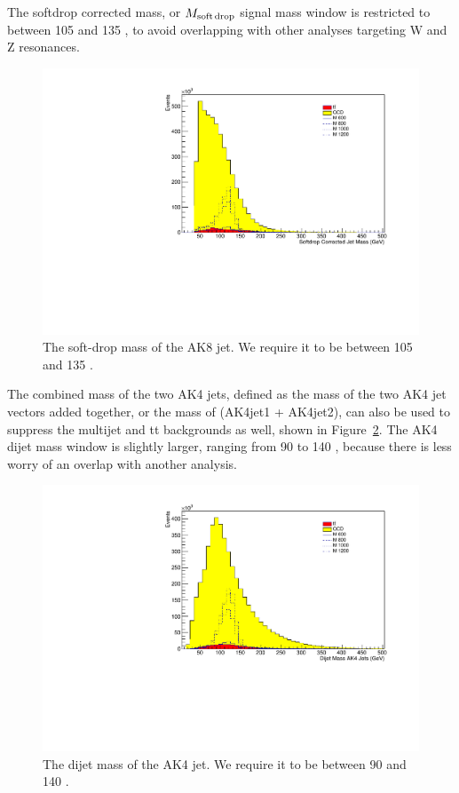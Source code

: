 The softdrop corrected mass, or $M_{\rm soft\,drop}$ signal mass window is restricted to between 105 and 135 \GeV, to avoid overlapping with other analyses targeting W and Z resonances. 

\begin{figure}[thb!]
\begin{center}
\includegraphics[scale=0.5]{F5/shapejetmass.pdf}
\end{center}
\caption{The soft-drop mass of the AK8 jet. We require it to be between 105 and 135 \GeV.}
\label{fig:AK8mass}
\end{figure} 

The combined mass of the two AK4 jets, defined as the mass of the two AK4 jet vectors added together, or the mass of (AK4jet1 + AK4jet2), can also be used to suppress the multijet and tt backgrounds as well, shown in Figure~\ref{fig:AK4dijetmass}. The AK4 dijet mass window is slightly larger, ranging from 90 to 140 \GeV, because there is less worry of an overlap with another analysis.

\begin{figure}[thb!]
\begin{center}
\includegraphics[scale=0.5]{F5/shapedijetmass.pdf}
\end{center}
\caption{The dijet mass of the AK4 jet. We require it to be between 90 and 140 \GeV.}
\label{fig:AK4dijetmass}
\end{figure}

